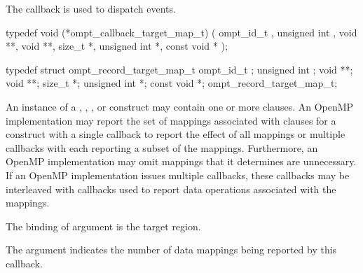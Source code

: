 \label{sec:ompt_callback_target_map_t}
\summary
The  callback is used to dispatch
 events.

\format

\begin{ccppspecific}
\begin{omptCallback}
typedef void (*ompt_callback_target_map_t) (
  ompt_id_t ,
  unsigned int ,
  void **,
  void **,
  size_t *,
  unsigned int *,
  const void *
);
\end{omptCallback}
\end{ccppspecific}


\record

\begin{ccppspecific}
\begin{omptRecord}
typedef struct ompt_record_target_map_t {
  ompt_id_t ;
  unsigned int ;
  void **;
  void **;
  size_t *;
  unsigned int *;
  const void *;
} ompt_record_target_map_t;
\end{omptRecord}
\end{ccppspecific}


\descr
An instance of a , , , or 
 construct may contain one or more  clauses.
An OpenMP implementation may report the set of mappings associated with  clauses for a construct
with a single  callback to report the effect of all mappings or multiple
 callbacks with each reporting a subset of the mappings.
Furthermore, an OpenMP implementation may omit mappings that it determines are unnecessary.
If an OpenMP implementation issues multiple 
callbacks, these callbacks may be interleaved with  callbacks
used to report data operations associated with the mappings.

\argdesc

The binding of argument  is the target region.

The argument  indicates the number of data mappings being reported by this callback.

